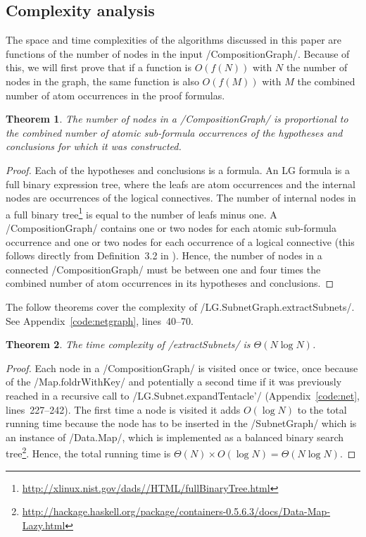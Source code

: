 \documentclass[12pt,a4paper]{article}
\newtheorem{theorem}{Theorem}
\begin{document}
\subsection{Complexity analysis}

The space and time complexities of the algorithms discussed in this paper are functions of the number of nodes in the input \hs/CompositionGraph/. Because of this, we will first prove that if a function is $O(f(N))$ with $N$ the number of nodes in the graph, the same function is also $O(f(M))$ with $M$ the combined number of atom occurrences in the proof formulas.
\begin{theorem}\label{thm:nodes}
    The number of nodes in a \hs/CompositionGraph/ is proportional to the combined number of atomic sub-formula occurrences of the hypotheses and conclusions for which it was constructed.
\end{theorem}
\begin{proof}
    Each of the hypotheses and conclusions is a formula. An LG formula is a full binary expression tree, where the leafs are atom occurrences and the internal nodes are occurrences of the logical connectives. The number of internal nodes in a full binary tree\footnote{\url{http://xlinux.nist.gov/dads//HTML/fullBinaryTree.html}} is equal to the number of leafs minus one. A \hs/CompositionGraph/ contains one or two nodes for each atomic sub-formula occurrence and one or two nodes for each occurrence of a logical connective (this follows directly from Definition~3.2 in \cite[p.~23]{mm12}). Hence, the number of nodes in a connected \hs/CompositionGraph/ must be between one and four times the combined number of atom occurrences in its hypotheses and conclusions.
\end{proof}

The follow theorems cover the complexity of \hs/LG.SubnetGraph.extractSubnets/. See Appendix~\ref{code:netgraph}, lines~40--70.
\begin{theorem}\label{thm:netgraph-time}
    The time complexity of \hs/extractSubnets/ is $\Theta(N \log N)$.
\end{theorem}
\begin{proof}
    Each node in a \hs/CompositionGraph/ is visited once or twice, once because of the \hs/Map.foldrWithKey/ and potentially a second time if it was previously reached in a recursive call to \hs/LG.Subnet.expandTentacle'/ (Appendix~\ref{code:net}, lines~227--242). The first time a node is visited it adds $O(\log N)$ to the total running time because the node has to be inserted in the \hs/SubnetGraph/ which is an instance of \hs/Data.Map/, which is implemented as a balanced binary search tree\footnote{\url{http://hackage.haskell.org/package/containers-0.5.6.3/docs/Data-Map-Lazy.html}}. Hence, the total running time is $\Theta(N)\times O(\log N) = \Theta(N\log N)$.
\end{proof}
\end{document}
